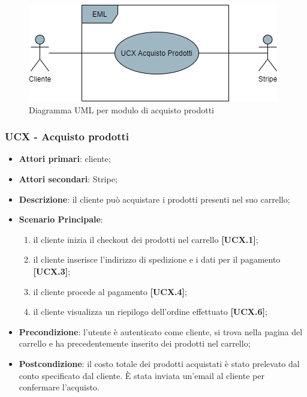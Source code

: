 \begin{figure}[H]
\centering
\includegraphics[scale=0.6]{res/UseCase/Immagini/AcquistoProdottiGenerale}
\caption{Diagramma UML per modulo di acquisto prodotti}
\end{figure}

\subsubsection{UCX - Acquisto prodotti}
\begin{itemize}
\item \textbf{Attori primari}: cliente;
\item \textbf{Attori secondari}: Stripe;
\item \textbf{Descrizione}: il cliente può acquistare i prodotti presenti nel suo carrello;
\item \textbf{Scenario Principale}: 
\begin{enumerate}
	\item il cliente inizia il checkout dei prodotti nel carrello \textbf{[UCX.1]};
	\item il cliente inserisce l'indirizzo di spedizione e i dati per il pagamento \textbf{[UCX.3]};
	\item il cliente procede al pagamento \textbf{[UCX.4]};
	\item il cliente visualizza un riepilogo dell'ordine effettuato \textbf{[UCX.6]};
\end{enumerate}
\item \textbf{Precondizione}: l'utente è autenticato come cliente, si trova nella pagina del carrello e ha precedentemente inserito dei prodotti nel carrello;
\item \textbf{Postcondizione}: il costo totale dei prodotti acquistati è stato prelevato dal conto specificato dal cliente. È stata inviata un'email al cliente per confermare l'acquisto.
\end{itemize}

